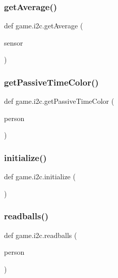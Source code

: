 \subsubsection{\texorpdfstring{get\+Average()}{getAverage()}}
{\footnotesize\ttfamily def game.\+i2c.\+get\+Average (\begin{DoxyParamCaption}\item[{}]{sensor }\end{DoxyParamCaption})}

\hypertarget{namespacegame_1_1i2c_aff5b5c1346a69dfa85f464da0d1df030}{}\label{namespacegame_1_1i2c_aff5b5c1346a69dfa85f464da0d1df030} 
\subsubsection{\texorpdfstring{get\+Passive\+Time\+Color()}{getPassiveTimeColor()}}
{\footnotesize\ttfamily def game.\+i2c.\+get\+Passive\+Time\+Color (\begin{DoxyParamCaption}\item[{}]{person }\end{DoxyParamCaption})}

\hypertarget{namespacegame_1_1i2c_aa72744d8ce34e48fe75bd216ac66d0e4}{}\label{namespacegame_1_1i2c_aa72744d8ce34e48fe75bd216ac66d0e4} 
\subsubsection{\texorpdfstring{initialize()}{initialize()}}
{\footnotesize\ttfamily def game.\+i2c.\+initialize (\begin{DoxyParamCaption}{ }\end{DoxyParamCaption})}

\hypertarget{namespacegame_1_1i2c_ab81bf937d9c153a616b84229be27cfdf}{}\label{namespacegame_1_1i2c_ab81bf937d9c153a616b84229be27cfdf} 
\subsubsection{\texorpdfstring{readballs()}{readballs()}}
{\footnotesize\ttfamily def game.\+i2c.\+readballs (\begin{DoxyParamCaption}\item[{}]{person }\end{DoxyParamCaption})}

